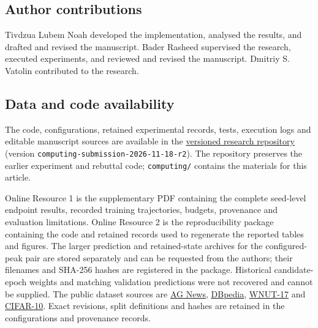 \documentclass[smallextended]{svjour3}
\begin{document}
\subsection{Author contributions}\label{author-contributions}

Tivdzua Lubem Noah developed the implementation, analysed the results, and drafted and revised the manuscript. Bader Rasheed supervised the research, executed experiments, and reviewed and revised the manuscript. Dmitriy S. Vatolin contributed to the research.

\subsection{Data and code availability}\label{data-and-code-availability}

The code, configurations, retained experimental records, tests, execution logs and editable manuscript sources are available in the \href{https://github.com/tivdzualubem/warmup-update-budget-acml2026/tree/computing-submission-2026-11-18-r2}{versioned research repository} (version \texttt{computing-submission-2026-11-18-r2}). The repository preserves the earlier experiment and rebuttal code; \texttt{computing/} contains the materials for this article.

Online Resource 1 is the supplementary PDF containing the complete seed-level endpoint results, recorded training trajectories, budgets, provenance and evaluation limitations. Online Resource 2 is the reproducibility package containing the code and retained records used to regenerate the reported tables and figures. The larger prediction and retained-state archives for the configured-peak pair are stored separately and can be requested from the authors; their filenames and SHA-256 hashes are registered in the package. Historical candidate-epoch weights and matching validation predictions were not recovered and cannot be supplied. The public dataset sources are \href{https://huggingface.co/datasets/fancyzhx/ag_news}{AG News}, \href{https://huggingface.co/datasets/fancyzhx/dbpedia_14}{DBpedia}, \href{https://huggingface.co/datasets/flaitenberger/wnut_17}{WNUT-17} and \href{https://huggingface.co/datasets/uoft-cs/cifar10}{CIFAR-10}. Exact revisions, split definitions and hashes are retained in the configurations and provenance records.



\end{document}

